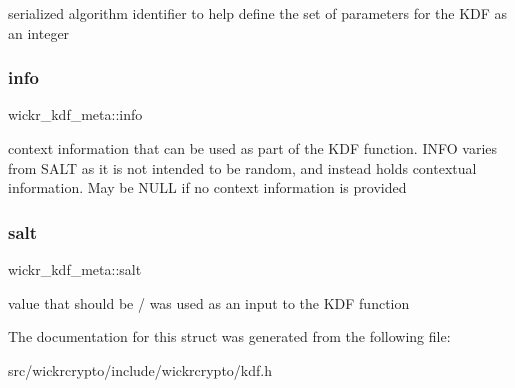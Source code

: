 serialized algorithm identifier to help define the set of parameters for the K\+DF as an integer \mbox{\label{structwickr__kdf__meta_abf3edef445c8849c356d1282e49033f4}} 
\subsubsection{\texorpdfstring{info}{info}}
{\footnotesize\ttfamily wickr\+\_\+kdf\+\_\+meta\+::info}

context information that can be used as part of the K\+DF function. I\+N\+FO varies from S\+A\+LT as it is not intended to be random, and instead holds contextual information. May be N\+U\+LL if no context information is provided \mbox{\label{structwickr__kdf__meta_a315c54ee4578a01266a4e7352a52d459}} 
\subsubsection{\texorpdfstring{salt}{salt}}
{\footnotesize\ttfamily wickr\+\_\+kdf\+\_\+meta\+::salt}

value that should be / was used as an input to the K\+DF function 

The documentation for this struct was generated from the following file\+:\begin{DoxyCompactItemize}
\item 
src/wickrcrypto/include/wickrcrypto/kdf.\+h\end{DoxyCompactItemize}
